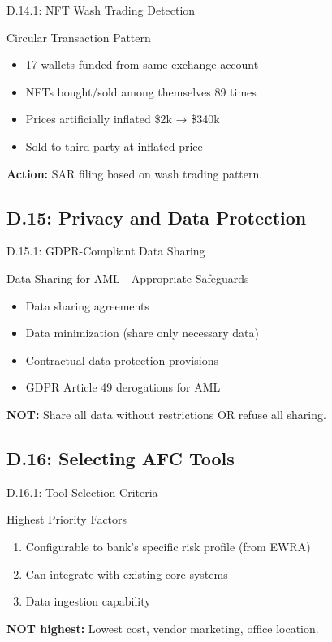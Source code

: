 \documentclass{beamer}
\begin{document}
		\begin{frame}{D.14.1: NFT Wash Trading Detection}
			\begin{block}{Circular Transaction Pattern}
				\begin{itemize}
					\item 17 wallets funded from same exchange account
					\item NFTs bought/sold among themselves 89 times
					\item Prices artificially inflated \$2k → \$340k
					\item Sold to third party at inflated price
				\end{itemize}
			\end{block}
			\textbf{Action:} SAR filing based on wash trading pattern.
		\end{frame}
		
		\subsection{D.15: Privacy and Data Protection}
		
		\begin{frame}{D.15.1: GDPR-Compliant Data Sharing}
			\begin{block}{Data Sharing for AML - Appropriate Safeguards}
				\begin{itemize}
					\item Data sharing agreements
					\item Data minimization (share only necessary data)
					\item Contractual data protection provisions
					\item GDPR Article 49 derogations for AML
				\end{itemize}
			\end{block}
			\textbf{NOT:} Share all data without restrictions OR refuse all sharing.
		\end{frame}
		
		\subsection{D.16: Selecting AFC Tools}
		
		\begin{frame}{D.16.1: Tool Selection Criteria}
			\begin{block}{Highest Priority Factors}
				\begin{enumerate}
					\item Configurable to bank's specific risk profile (from EWRA)
					\item Can integrate with existing core systems
					\item Data ingestion capability
				\end{enumerate}
			\end{block}
			\textbf{NOT highest:} Lowest cost, vendor marketing, office location.
		\end{frame}
		
\end{document}
